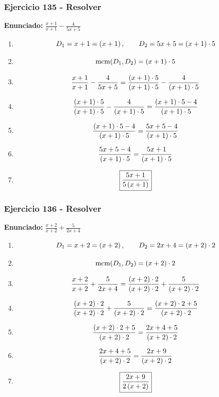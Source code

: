 \documentclass[11pt,a4paper]{article}
\newcommand{\fitmath}[1]{%
\[
\setbox0=\hbox{$\displaystyle #1$}%
\ifdim\wd0>\linewidth
\resizebox{\linewidth}{!}{$\displaystyle #1$}%
\else
#1%
\fi
\]
}
\begin{document}
\vspace{0.12cm}
\subsubsection*{Ejercicio 135 - Resolver}
\textbf{Enunciado:} $ \frac{x + 1}{x + 1} - \frac{4}{5 x + 5} $\par
\begin{enumerate}[leftmargin=2em]
\item \fitmath{D_1=x + 1=\left(x + 1\right),\qquad D_2=5 x + 5=\left(x + 1\right)\cdot 5}
\item \fitmath{\operatorname{mcm}(D_1,D_2)=\left(x + 1\right)\cdot 5}
\item \fitmath{\frac{x + 1}{x + 1} - \frac{4}{5 x + 5}= \frac{\left(x + 1\right)\cdot 5}{\left(x + 1\right)\cdot 5} - \frac{4}{\left(x + 1\right)\cdot 5}}
\item \fitmath{\frac{\left(x + 1\right)\cdot 5}{\left(x + 1\right)\cdot 5} - \frac{4}{\left(x + 1\right)\cdot 5}=\frac{\left(x + 1\right)\cdot 5 - 4}{\left(x + 1\right)\cdot 5}}
\item \fitmath{\frac{\left(x + 1\right)\cdot 5 - 4}{\left(x + 1\right)\cdot 5}=\frac{5 x + 5 - 4}{\left(x + 1\right)\cdot 5}}
\item \fitmath{\frac{5 x + 5 - 4}{\left(x + 1\right)\cdot 5}=\frac{5 x + 1}{\left(x + 1\right)\cdot 5}}
\item \fitmath{\boxed{\frac{5 x + 1}{5 \left(x + 1\right)}}}
\end{enumerate}

\vspace{0.12cm}
\subsubsection*{Ejercicio 136 - Resolver}
\textbf{Enunciado:} $ \frac{x + 2}{x + 2} + \frac{5}{2 x + 4} $\par
\begin{enumerate}[leftmargin=2em]
\item \fitmath{D_1=x + 2=\left(x + 2\right),\qquad D_2=2 x + 4=\left(x + 2\right)\cdot 2}
\item \fitmath{\operatorname{mcm}(D_1,D_2)=\left(x + 2\right)\cdot 2}
\item \fitmath{\frac{x + 2}{x + 2} + \frac{5}{2 x + 4}= \frac{\left(x + 2\right)\cdot 2}{\left(x + 2\right)\cdot 2} + \frac{5}{\left(x + 2\right)\cdot 2}}
\item \fitmath{\frac{\left(x + 2\right)\cdot 2}{\left(x + 2\right)\cdot 2} + \frac{5}{\left(x + 2\right)\cdot 2}=\frac{\left(x + 2\right)\cdot 2 + 5}{\left(x + 2\right)\cdot 2}}
\item \fitmath{\frac{\left(x + 2\right)\cdot 2 + 5}{\left(x + 2\right)\cdot 2}=\frac{2 x + 4 + 5}{\left(x + 2\right)\cdot 2}}
\item \fitmath{\frac{2 x + 4 + 5}{\left(x + 2\right)\cdot 2}=\frac{2 x + 9}{\left(x + 2\right)\cdot 2}}
\item \fitmath{\boxed{\frac{2 x + 9}{2 \left(x + 2\right)}}}
\end{enumerate}
\end{document}
